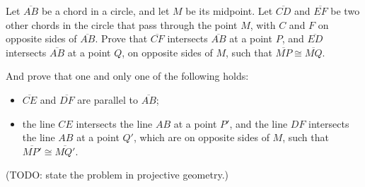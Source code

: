 Let $\overline{AB}$ be a chord in a circle,
and let $M$ be its midpoint.
Let $\overline{CD}$ and $\overline{EF}$ be two other chords in the circle
that pass through the point $M$,
with $C$ and $F$ on opposite sides of $\overline{AB}$.
Prove that $\overline{CF}$ intersects $\overline{AB}$ at a point $P$,
and $\overline{ED}$ intersects $\overline{AB}$ at a point $Q$,
on opposite sides of $M$,
such that $\overline{MP} \cong \overline{MQ}$.

And prove that one and only one of the following holds:
\vspace{-1ex}
\begin{itemize}
\item[--] $\overline{CE}$ and $\overline{DF}$ are parallel to $\overline{AB}$;
\vspace{-1ex}
\item[--] the line $CE$ intersects the line $AB$ at a point $P'$,
and the line $DF$ intersects the line $AB$ at a point $Q'$,
which are on opposite sides of $M$,
such that $\overline{MP'} \cong \overline{MQ'}$.
\end{itemize}

(TODO: state the problem in projective geometry.)
